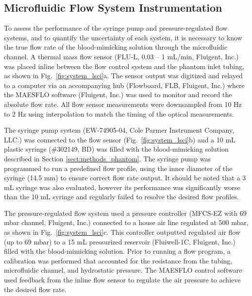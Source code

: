 \documentclass[12pt]{spieman}
\begin{document}
\begin{spacing}{2}
\subsection{Microfluidic Flow System Instrumentation}

To assess the performance of the syringe pump and pressure-regulated flow systems, and to quantify the uncertainty of each system, it is necessary to know the true flow rate of the blood-mimicking solution through the microfluidic channel. A thermal mass flow sensor (FLU-L, 0.03 -- 1 mL/min, Fluigent, Inc.) was placed inline between the flow control system and the phantom inlet tubing, as shown in Fig.~\ref{fig:system_lsci}a. The sensor output was digitized and relayed to a computer via an accompanying hub (Flowboard, FLB, Fluigent, Inc.) where the MAESFLO software (Fluigent, Inc.) was used to monitor and record the absolute flow rate. All flow sensor measurements were downsampled from 10 Hz to 2 Hz using interpolation to match the timing of the optical measurements.

The syringe pump system (EW-74905-04, Cole Parmer Instrument Company, LLC.) was connected to the flow sensor (Fig.~\ref{fig:system_lsci}b) and a 10 mL plastic syringe (\#302149, BD) was filled with the blood-mimicking solution described in Section \ref{sect:methods_phantom}. The syringe pump was programmed to run a predefined flow profile, using the inner diameter of the syringe (14.5 mm) to ensure correct flow rate output. It should be noted that a 3 mL syringe was also evaluated, however its performance was significantly worse than the 10 mL syringe and regularly failed to resolve the desired flow profiles.

The pressure-regulated flow system used a pressure controller (MFCS-EZ with 69 mbar channel, Fluigent, Inc.) connected to a house air line regulated at 500 mbar, as shown in Fig.~\ref{fig:system_lsci}c. This controller outputted regulated air flow (up to 69 mbar) to a 15 mL pressurized reservoir (Fluiwell-1C, Fluigent, Inc.) filled with the blood-mimicking solution. Prior to running a flow program, a calibration was performed that accounted for the resistance from the tubing, microfluidic channel, and hydrostatic pressure. The MAESFLO control software used feedback from the inline flow sensor to regulate the air pressure to achieve the desired flow rate.


\end{spacing}
\end{document}
